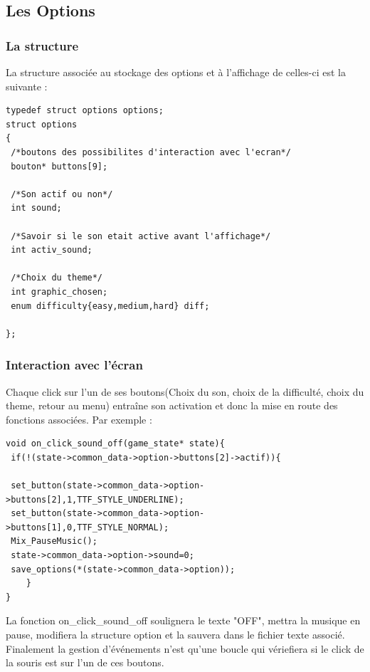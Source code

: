 \subsection{Les Options}
\subsubsection{La structure}
La structure associée au stockage des options et à l'affichage de celles-ci est la suivante :
\begin{lstlisting}
typedef struct options options;
struct options
{		
 /*boutons des possibilites d'interaction avec l'ecran*/
 bouton* buttons[9];
		
 /*Son actif ou non*/
 int sound;
		
 /*Savoir si le son etait active avant l'affichage*/
 int activ_sound;
   
 /*Choix du theme*/
 int graphic_chosen;
 enum difficulty{easy,medium,hard} diff;

};
\end{lstlisting}
\subsubsection{Interaction avec l'écran}
Chaque click sur l'un de ses boutons(Choix du son, choix de la difficulté, choix du theme, retour au menu) entraîne son activation et donc la mise en route des fonctions associées. Par exemple :
\begin{lstlisting}
void on_click_sound_off(game_state* state){
 if(!(state->common_data->option->buttons[2]->actif)){

 set_button(state->common_data->option->buttons[2],1,TTF_STYLE_UNDERLINE);
 set_button(state->common_data->option->buttons[1],0,TTF_STYLE_NORMAL);
 Mix_PauseMusic();
 state->common_data->option->sound=0;
 save_options(*(state->common_data->option));
	}
}
\end{lstlisting}
La fonction on_click_sound_off soulignera le texte "OFF", mettra la musique en pause, modifiera la structure option et la sauvera dans le fichier texte associé. Finalement la gestion d'événements n'est qu'une boucle qui vériefiera si le click de la souris est sur l'un de ces boutons. 

